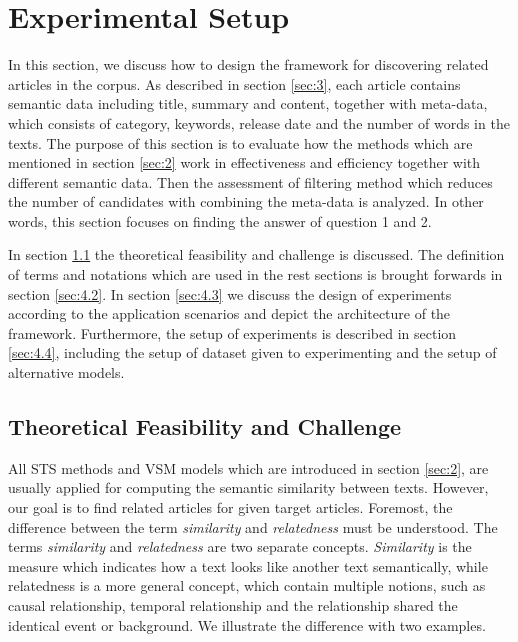 \section{Experimental Setup}
\label{sec:4}
In this section, we discuss how to design the framework for discovering related articles in the corpus. As described in section \ref{sec:3}, each article contains semantic data including title, summary and content, together with meta-data, which consists of category, keywords, release date and the number of words in the texts. The purpose of this section is to evaluate how the methods which are mentioned in section \ref{sec:2} work in effectiveness and efficiency together with different semantic data. Then the assessment of filtering method which reduces the number of candidates with combining the meta-data is analyzed. In other words, this section focuses on finding the answer of question 1 and 2.

In section \ref{sec:4.1} the theoretical feasibility and challenge is discussed. The definition of terms and notations which are used in the rest sections is brought forwards in section \ref{sec:4.2}. In section \ref{sec:4.3} we discuss the design of experiments according to the application scenarios and depict the architecture of the framework. Furthermore, the setup of experiments is described in section \ref{sec:4.4}, including the setup of dataset given to experimenting and the setup of alternative models. 

\subsection{Theoretical Feasibility and Challenge}
\label{sec:4.1}

All STS methods and VSM models which are introduced in section \ref{sec:2}, are usually applied for computing the semantic similarity between texts. However, our goal is to find related articles for given target articles. Foremost, the difference between the term \textit{similarity} and \textit{relatedness} must be understood. The terms \textit{similarity} and \textit{relatedness} are two separate concepts\cite{pedersen2007measures}. \textit{Similarity} is the measure which indicates how a text looks like another text semantically, while relatedness is a more general concept, which contain multiple notions, such as causal relationship, temporal relationship and the relationship shared the identical event or background. We illustrate the difference with two examples. 

